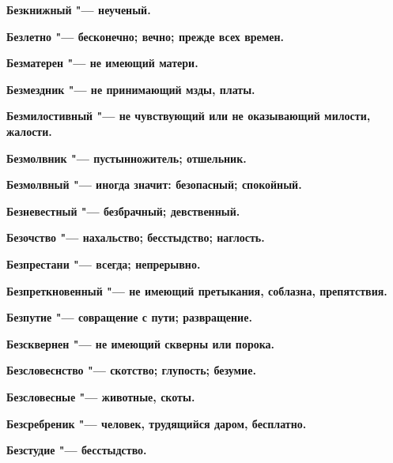 \begin{multicols}{2}
\bfseries Безкнижный\normalfont{} "--- неученый. 




\bfseries Безлетно\normalfont{} "--- бесконечно; вечно; прежде всех времен. 




\bfseries Безматерен\normalfont{} "--- не имеющий матери. 




\bfseries Безмездник\normalfont{} "--- не принимающий мзды, платы. 




\bfseries Безмилостивный\normalfont{} "--- не чувствующий или не оказывающий милости, жалости. 




\bfseries Безмолвник\normalfont{} "--- пустынножитель; отшельник. 




\bfseries Безмолвный\normalfont{} "--- иногда значит: безопасный; спокойный. 




\bfseries Безневестный\normalfont{} "--- безбрачный; девственный. 




\bfseries Безочство\normalfont{} "--- нахальство; бесстыдство; наглость. 




\bfseries Безпрестани\normalfont{} "--- всегда; непрерывно. 




\bfseries Безпреткновенный\normalfont{} "--- не имеющий претыкания, соблазна, препятствия. 




\bfseries Безпутие\normalfont{} "--- совращение с пути; развращение. 




\bfseries Безсквернен\normalfont{} "--- не имеющий скверны или порока. 




\bfseries Безсловеснство\normalfont{} "--- скотство; глупость; безумие. 




\bfseries Безсловесные\normalfont{} "--- животные, скоты. 




\bfseries Безсребреник\normalfont{} "--- человек, трудящийся даром, бесплатно. 




\bfseries Безстудие\normalfont{} "--- бесстыдство. 





\end{multicols}
